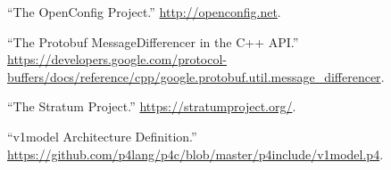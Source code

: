 \documentclass[11pt]{article}
\begin{document}
{{\begin{thebibliography}{38}
\mdbibitemlabel{{}[34]}\textquotedblleft{}The OpenConfig Project.\textquotedblright{} \href{http://openconfig.net}{{\ttfamily http://\hspace{0pt}openconfig.\hspace{0pt}net}}.\label{openconfig}%

\mdbibitemlabel{{}[35]}\textquotedblleft{}The Protobuf MessageDifferencer in the C++ API.\textquotedblright{} \href{https://developers.google.com/protocol-buffers/docs/reference/cpp/google.protobuf.util.message_differencer}{{\ttfamily https://\hspace{0pt}developers.\hspace{0pt}google.\hspace{0pt}com/\hspace{0pt}protocol-\hspace{0pt}buffers/\hspace{0pt}docs/\hspace{0pt}reference/\hspace{0pt}cpp/\hspace{0pt}google.\hspace{0pt}protobuf.\hspace{0pt}util.\hspace{0pt}message\_\hspace{0pt}differencer}}.\label{protomessagedifferencer}%

\mdbibitemlabel{{}[36]}\textquotedblleft{}The Stratum Project.\textquotedblright{} \href{https://stratumproject.org/}{{\ttfamily https://\hspace{0pt}stratumproject.\hspace{0pt}org/\hspace{0pt}}}.\label{stratum}%

\mdbibitemlabel{{}[37]}\textquotedblleft{}v1model Architecture Definition.\textquotedblright{} \href{https://github.com/p4lang/p4c/blob/master/p4include/v1model.p4}{{\ttfamily https://\hspace{0pt}github.\hspace{0pt}com/\hspace{0pt}p4lang/\hspace{0pt}p4c/\hspace{0pt}blob/\hspace{0pt}master/\hspace{0pt}p4include/\hspace{0pt}v1model.\hspace{0pt}p4}}.\label{v1model}%


\end{thebibliography}}}
\end{document}
